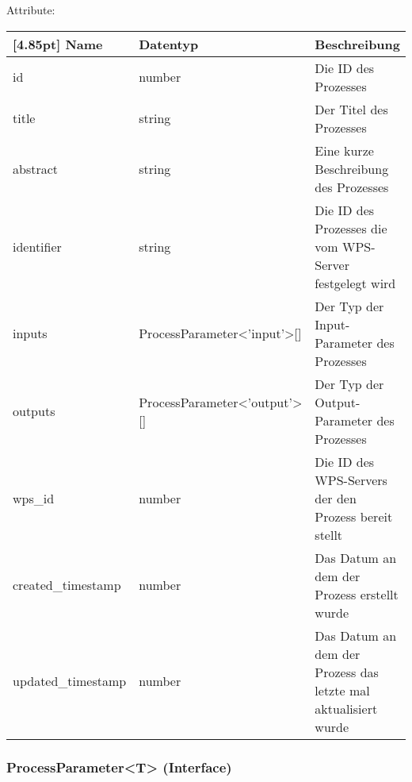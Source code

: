     		Attribute:
            \begin{center}
            	\renewcommand{\arraystretch}{1.5}
                \setlength\tabcolsep{5pt}
            	\begin{tabularx}{\textwidth}{|l|l|X|}
            		\hline
                    \rowcolor[gray]{0.75}[4.85pt]            		
                    Name & Datentyp & Beschreibung \\ \hline
            		id & number & Die ID des Prozesses \\ \hline
            		title & string & Der Titel des Prozesses \\ \hline
            		abstract & string & Eine kurze Beschreibung des Prozesses \\ \hline
            		identifier & string & Die ID des Prozesses die vom WPS-Server festgelegt wird \\ \hline
                    inputs & ProcessParameter<'input'>[] & Der Typ der Input-Parameter des Prozesses \\ \hline
                    outputs & ProcessParameter<'output'>[] & Der Typ der Output-Parameter des Prozesses \\ \hline
            		wps_id & number & Die ID des WPS-Servers der den Prozess bereit stellt \\ \hline
            		created_timestamp & number & Das Datum an dem der Prozess erstellt wurde \\ \hline
            		updated_timestamp & number & Das Datum an dem der Prozess das letzte mal aktualisiert wurde \\ \hline
            	\end{tabularx}
            \end{center}
                
    		\subsubsection{ProcessParameter<T> (Interface)}
    		
